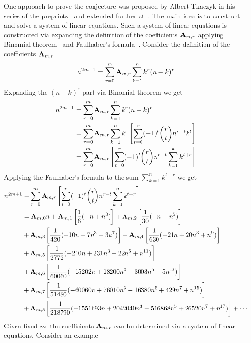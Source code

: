 One approach to prove the conjecture was proposed by Albert Tkaczyk
in his series of the preprints~\cite{tkaczyk2018problem, tkaczyk2018continuation}
and extended further at~\cite{kolosov2022106}.
The main idea is to construct and solve a system of linear equations.
Such a system of linear equations is constructed
via expanding the definition of the coefficients ${\mathbf{A}} \sb{m,r}$
applying Binomial theorem~\cite{abramowitz1988handbook} and Faulhaber's formula~\cite{beardon1996sums}.
Consider the definition of the coefficients ${\mathbf{A}} \sb{m,r}$
\begin{equation}
    n^{2m+1} = \sum_{r=0}^{m} {\mathbf{A}} \sb{m,r} \sum_{k=1}^{n} k^{r} (n-k)^{r}\label{eq:odd-power-identity}
\end{equation}
Expanding the $(n-k)^r$ part via Binomial theorem we get
\begin{equation*}
    \begin{split}
        n^{2m+1} &= \sum_{r=0}^{m} {\mathbf{A}} \sb{m,r} \sum_{k=1}^{n} k^{r} (n-k)^{r} \\
        &= \sum_{r=0}^{m} {\mathbf{A}} \sb{m,r} \sum_{k=1}^{n} k^{r} \left[ \sum_{t=0}^{r} (-1)^t \binom{r}{t} n^{r-t} k^{t} \right] \\
        &= \sum_{r=0}^{m} {\mathbf{A}} \sb{m,r} \left[ \sum_{t=0}^{r} (-1)^t \binom{r}{t} n^{r-t} \sum_{k=1}^{n} k^{t+r} \right] \\
    \end{split}
\end{equation*}
Applying the Faulhaber's formula to the sum $\sum_{k=1}^{n} k^{t+r}$ we get
\begin{equation}
    \begin{split}
        n^{2m+1}
        &= \sum_{r=0}^{m} {\mathbf{A}} \sb{m,r} \left[ \sum_{t=0}^{r} (-1)^t \binom{r}{t} n^{r-t} \sum_{k=1}^{n} k^{t+r} \right] \\
        &= {\mathbf{A}} \sb{m,0} n  + {\mathbf{A}} \sb{m,1} \left[ \frac{1}{6} (-n + n^3) \right] + {\mathbf{A}} \sb{m,2} \left[ \frac{1}{30} (-n + n^5) \right] \\
        &+ {\mathbf{A}} \sb{m,3} \left[ \frac{1}{420} (-10 n + 7 n^3 + 3 n^7) \right] + {\mathbf{A}} \sb{m,4} \left[ \frac{1}{630} (-21 n + 20 n^3 + n^9) \right] \\
        &+ {\mathbf{A}} \sb{m,5} \left[ \frac{1}{2772} (-210 n + 231 n^3 - 22 n^5 + n^{11}) \right] \\
        &+ {\mathbf{A}} \sb{m,6} \left[ \frac{1}{60060} (-15202 n + 18200 n^3 - 3003 n^5 + 5 n^{13}) \right] \\
        &+ {\mathbf{A}} \sb{m,7} \left[ \frac{1}{51480} (-60060 n + 76010 n^3 - 16380 n^5 + 429 n^7 + n^{15}) \right] \\
        &+ {\mathbf{A}} \sb{m,8} \left[ \frac{1}{218790} (-1551693 n + 2042040 n^3 - 516868 n^5 + 26520 n^7 + n^{17}) \right] + \cdots
    \end{split}\label{eq:arbitrary-relation}
\end{equation}
Given fixed $m$, the coefficients ${\mathbf{A}} \sb{m,r}$ can be determined via a system of linear equations.
Consider an example